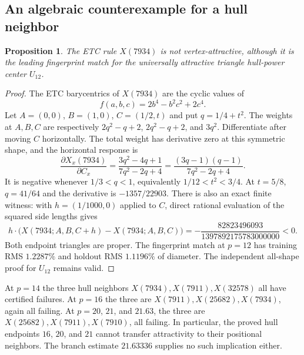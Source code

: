 \documentclass[11pt]{article}
\newtheorem{proposition}[theorem]{Proposition}
\theoremstyle{definition}
\begin{document}
\subsection{An algebraic counterexample for a hull neighbor}
\begin{proposition}\label{prop:neighbor-negative}
The ETC rule $X(7934)$ is not vertex-attractive, although it is the leading
fingerprint match for the universally attractive triangle hull-power
center $U_{12}$.
\end{proposition}
\begin{proof}
The ETC barycentrics of $X(7934)$ are the cyclic values of
\[
 f(a,b,c)=2b^4-b^2c^2+2c^4.
\]
Let $A=(0,0)$, $B=(1,0)$, $C=(1/2,t)$ and put $q=1/4+t^2$.
The weights at $A,B,C$ are respectively
$2q^2-q+2$, $2q^2-q+2$, and $3q^2$. Differentiate after moving $C$
horizontally. The total weight has derivative zero at this symmetric
shape, and the horizontal response is
\begin{equation}\label{eq:7934-negative}
 \frac{\partial X_x(7934)}{\partial C_x}
 =\frac{3q^2-4q+1}{7q^2-2q+4}
 =\frac{(3q-1)(q-1)}{7q^2-2q+4}.
\end{equation}
It is negative whenever $1/3<q<1$, equivalently
$1/12<t^2<3/4$. At $t=5/8$, $q=41/64$ and the derivative is
$-1357/22903$. There is also an exact finite witness: with
$h=(1/1000,0)$ applied to $C$, direct rational evaluation of the squared
side lengths gives
\[
 h\cdot\bigl(X(7934;A,B,C+h)-X(7934;A,B,C)\bigr)
 =-\frac{82823496093}{1397892175783000000}<0.
\]
Both endpoint triangles are proper. The fingerprint match at $p=12$
has training RMS $1.2287\%$ and holdout RMS $1.1196\%$ of diameter.
The independent all-shape proof for $U_{12}$ remains valid.
\end{proof}

At $p=14$ the three hull neighbors $X(7934),X(7911),X(32578)$ all have
certified failures. At $p=16$ the three are
$X(7911),X(25682),X(7934)$, again all failing. At $p=20$, $21$, and
$21.63$, the three are $X(25682),X(7911),X(7910)$, all failing.
In particular, the proved hull endpoints $16$, $20$, and $21$ cannot
transfer attractivity to their positional neighbors. The branch estimate
$21.63336$ supplies no such implication either.
\end{document}
